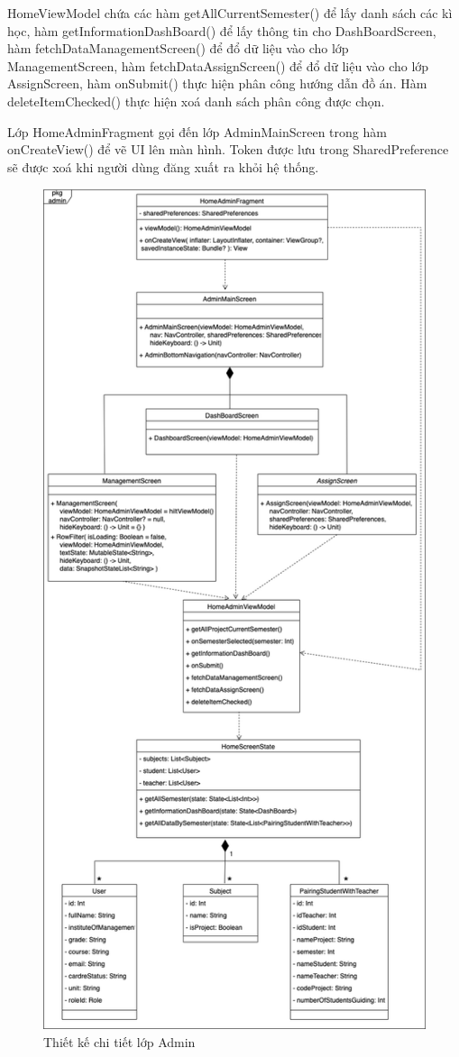 \documentclass[../Main.tex]{subfiles}
\begin{document}
HomeViewModel chứa các hàm getAllCurrentSemester() để lấy danh sách các kì học, hàm getInformationDashBoard() để lấy thông tin cho DashBoardScreen, hàm fetchDataManagementScreen() để đổ dữ liệu vào cho lớp ManagementScreen,  hàm fetchDataAssignScreen() để đổ dữ liệu vào cho lớp AssignScreen, hàm onSubmit() thực hiện phân công hướng dẫn đồ án. Hàm deleteItemChecked() thực hiện xoá danh sách phân công được chọn. 

Lớp HomeAdminFragment gọi đến lớp AdminMainScreen trong hàm onCreateView() để vẽ UI lên màn hình. Token được lưu trong SharedPreference sẽ được xoá khi người dùng đăng xuất ra khỏi hệ thống.
\newpage
\begin{figure}[H]
    \centering
    \includegraphics[width=0.76\linewidth]{Figure/chi_tiet_lop_admin (1).png}
    \caption{Thiết kế chi tiết lớp Admin}
    \label{fig:use_case_tổng_quan}
\end{figure}\newpage
\end{document}
